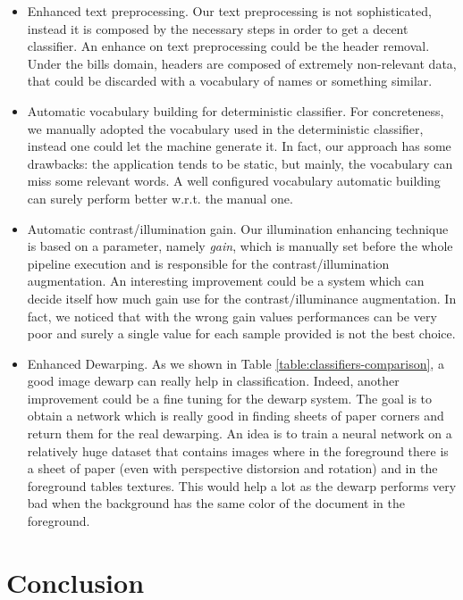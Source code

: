 \documentclass[10pt,twocolumn,letterpaper]{article}
\begin{document}
\begin{itemize}
  \item Enhanced text preprocessing. Our text preprocessing is not
    sophisticated, instead it is composed by the necessary steps in
    order to get a decent classifier. An enhance on text preprocessing
    could be the header removal. Under the bills domain, headers are
    composed of extremely non-relevant data, that could be discarded
    with a vocabulary of names or something similar.
  \item Automatic vocabulary building for deterministic
    classifier. For concreteness, we manually adopted the vocabulary
    used in the deterministic classifier, instead one could let the
    machine generate it. In fact, our approach has some drawbacks: the
    application tends to be static, but mainly, the vocabulary can
    miss some relevant words. A well configured vocabulary automatic
    building can surely perform better w.r.t. the manual one.
  \item Automatic contrast/illumination gain. Our illumination
    enhancing technique is based on a parameter, namely \emph{gain},
    which is manually set before the whole pipeline execution and is
    responsible for the contrast/illumination augmentation. An
    interesting improvement could be a system which can decide itself
    how much gain use for the contrast/illuminance augmentation. In
    fact, we noticed that with the wrong gain values performances can
    be very poor and surely a single value for each sample provided is
    not the best choice.
  \item Enhanced Dewarping. As we shown in Table
    \ref{table:classifiers-comparison}, a good image dewarp can really
    help in classification. Indeed, another improvement could be a
    fine tuning for the dewarp system. The goal is to obtain a network
    which is really good in finding sheets of paper corners and return
    them for the real dewarping. An idea is to train a neural network
    on a relatively huge dataset that contains images where in the
    foreground there is a sheet of paper (even with perspective
    distorsion and rotation) and in the foreground tables
    textures. This would help a lot as the dewarp performs very bad
    when the background has the same color of the document in the
    foreground.
\end{itemize}

\section{Conclusion}
\label{sec:conclusion}
\end{document}
